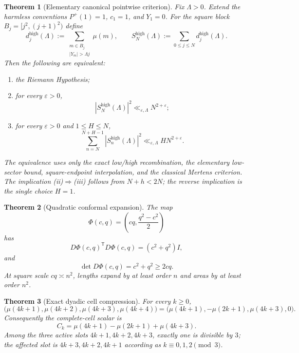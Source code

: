 \documentclass[11pt]{article}
\newtheorem{theorem}{Theorem}[section]
\theoremstyle{definition}
\newcommand{\eps}{\varepsilon}
\newcommand{\Pplus}{P^{+}}
\newcommand{\1}{\mathbf{1}}
\begin{document}
\begin{theorem}[Elementary canonical pointwise criterion]
\label{thm:intro-canonical-HS}
Fix $\Lambda>0$.  Extend the harmless conventions $\Pplus(1)=1$, $c_1=1$, and $Y_1=0$.  For the square block $B_j=[j^2,(j+1)^2)$ define
\[
 d_j^{\mathrm{high}}(\Lambda)
 :=
 \sum_{\substack{m\in B_j\\|Y_m|>\Lambda j}}\mu(m),
 \qquad
 S_N^{\mathrm{high}}(\Lambda)
 :=\sum_{0\le j\le N}d_j^{\mathrm{high}}(\Lambda).
\]
Then the following are equivalent:
\begin{enumerate}[label=\textup{(\roman*)},leftmargin=2.2em,itemsep=0.25em]
\item the Riemann Hypothesis;
\item for every $\eps>0$,
\begin{equation}
 \boxed{
 |S_N^{\mathrm{high}}(\Lambda)|^2
 \ll_{\eps,\Lambda}N^{2+\eps};
 }
 \tag{PHS}
 \label{eq:intro-canonical-PHS}
\end{equation}
\item for every $\eps>0$ and $1\le H\le N$,
\begin{equation}
 \sum_{n=N}^{N+H-1}|S_n^{\mathrm{high}}(\Lambda)|^2
 \ll_{\eps,\Lambda}HN^{2+\eps}.
 \tag{HS}
 \label{eq:intro-canonical-HS}
\end{equation}
\end{enumerate}
The equivalence uses only the exact low/high recombination, the elementary low-sector bound, square-endpoint interpolation, and the classical Mertens criterion.  The implication \textup{(ii)}$\Rightarrow$\textup{(iii)} follows from $N+h<2N$; the reverse implication is the single choice $H=1$.
\end{theorem}

\begin{theorem}[Quadratic conformal expansion]
\label{thm:intro-jacobian}
The map
\[
 \Phi(c,q)=\left(cq,\frac{q^2-c^2}{2}\right)
\]
has
\[
 D\Phi(c,q)^{\mathsf T}D\Phi(c,q)
 =(c^2+q^2)I,
\]
and
\[
 \det D\Phi(c,q)=c^2+q^2\ge2cq.
\]
At square scale $cq\asymp n^2$, lengths expand by at least order $n$ and areas by at least order $n^2$.
\end{theorem}

\begin{theorem}[Exact dyadic cell compression]
\label{thm:intro-dyadic-cell}
For every $k\ge0$,
\[
 \boxed{
 \bigl(\mu(4k+1),\mu(4k+2),\mu(4k+3),\mu(4k+4)\bigr)
 =\bigl(\mu(4k+1),-\mu(2k+1),\mu(4k+3),0\bigr).
 }
\]
Consequently the complete-cell scalar is
\[
 \boxed{C_k=\mu(4k+1)-\mu(2k+1)+\mu(4k+3).}
\]
Among the three active slots $4k+1,4k+2,4k+3$, exactly one is divisible by $3$; the affected slot is $4k+3,4k+2,4k+1$ according as $k\equiv0,1,2\pmod3$.
\end{theorem}
\end{document}
